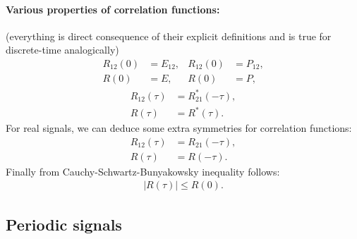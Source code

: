 \documentclass[11pt,a4paper]{report}
\theoremstyle{remark}
\theoremstyle{definition}
\begin{document}
				\paragraph{Various properties of correlation functions:} (everything is direct consequence of their explicit definitions and is true for discrete-time analogically)
				\begin{align}
					R_{12}(0) &= E_{12},
				&
					R_{12}(0) &= P_{12},
				\\
					R(0) &= E,
				&
					R(0) &= P,
				\end{align}
				\begin{align}
					R_{12}(\tau) &= R_{21}^*(-\tau),
				\\
					R(\tau) &= R^*(\tau).
				\end{align}
				For real signals, we can deduce some extra symmetries for correlation functions:
				\begin{align}
					R_{12}(\tau) &= R_{21}(-\tau),
				\\
					R(\tau) &= R(-\tau).
				\end{align}
				Finally from Cauchy-Schwartz-Bunyakowsky inequality follows:
				\begin{align}
					|R(\tau)| \leq R(0).
				\end{align}
			
			\subsection{Periodic signals}
				
\end{document}
